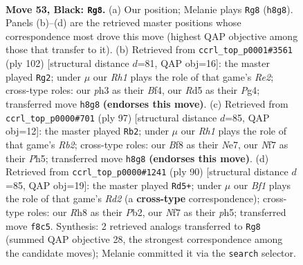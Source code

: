 \documentclass[11pt]{article}
\begin{document}
\clearpage

\begin{figure}[p]\centering
\begin{subfigure}{0.46\textwidth}\centering
\resizebox{\linewidth}{!}{%
\newchessgame
\chessboard[
  setfen={5b1r/p4nkp/P7/3r4/5B2/1Pp3KP/R1P3P1/R2B4 b - - 14 53},
  showmover=false,
  pgfstyle=straightmove, color=movearrow, markmove={h8-g8}
]}
\caption{}
\end{subfigure}\hfill
\begin{subfigure}{0.46\textwidth}\centering
\resizebox{\linewidth}{!}{%
\newchessgame
\chessboard[
  setfen={4R3/p2r1p2/1p3bk1/3r3p/5BPP/1P3K2/P3R3/8 w - - 6 52},
  showmover=false,
  pgfstyle=straightmove, color=movearrow, markmove={e2-g2}
]}
\caption{}
\end{subfigure}
\\[4pt]
\begin{subfigure}{0.46\textwidth}\centering
\resizebox{\linewidth}{!}{%
\newchessgame
\chessboard[
  setfen={3R4/1r2nkp1/4pp2/2P4p/r2P4/4P2P/6PK/3RB3 b - - 0 49},
  showmover=false,
  pgfstyle=straightmove, color=movearrow, markmove={b7-b2}
]}
\caption{}
\end{subfigure}\hfill
\begin{subfigure}{0.46\textwidth}\centering
\resizebox{\linewidth}{!}{%
\newchessgame
\chessboard[
  setfen={8/1p2r3/p3r2p/P4k1p/5Pb1/2R1B1P1/1P1R1K2/8 w - - 6 46},
  showmover=false,
  pgfstyle=straightmove, color=movearrow, markmove={d2-d5}
]}
\caption{}
\end{subfigure}
\caption{\textbf{Move 53, Black: \texttt{Rg8}.} (a) Our position; Melanie plays \texttt{Rg8} (\texttt{h8g8}). Panels (b)--(d) are the retrieved master positions whose correspondence most drove this move (highest QAP objective among those that transfer to it). (b) Retrieved from \texttt{ccrl\_top\_p0001\#3561} (ply 102) [structural distance $d$=81, QAP obj=16]: the master played \texttt{Rg2}; under $\mu$ our \emph{Rh1} plays the role of that game's \emph{Re2}; cross-type roles: our \emph{p}h3 as their \emph{B}f4, our \emph{R}d5 as their \emph{P}g4; transferred move \texttt{h8g8} \textbf{(endorses this move)}. (c) Retrieved from \texttt{ccrl\_top\_p0000\#701} (ply 97) [structural distance $d$=85, QAP obj=12]: the master played \texttt{Rb2}; under $\mu$ our \emph{Rh1} plays the role of that game's \emph{Rb2}; cross-type roles: our \emph{B}f8 as their \emph{N}e7, our \emph{N}f7 as their \emph{P}h5; transferred move \texttt{h8g8} \textbf{(endorses this move)}. (d) Retrieved from \texttt{ccrl\_top\_p0000\#1241} (ply 90) [structural distance $d$=85, QAP obj=19]: the master played \texttt{Rd5+}; under $\mu$ our \emph{Bf1} plays the role of that game's \emph{Rd2} (a \textbf{cross-type} correspondence); cross-type roles: our \emph{R}h8 as their \emph{P}b2, our \emph{N}f7 as their \emph{p}h5; transferred move \texttt{f8c5}. Synthesis: 2 retrieved analogs transferred to \texttt{Rg8} (summed QAP objective 28, the strongest correspondence among the candidate moves); Melanie committed it via the \texttt{search} selector.}
\label{fig:thought-m105}
\end{figure}
\end{document}
